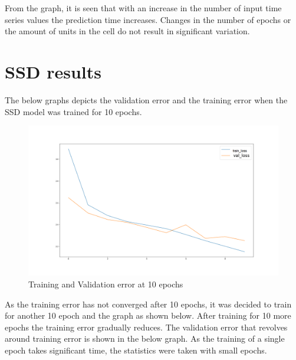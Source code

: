 From the graph, it is seen that with an increase in the number of input time series values the prediction time increases. Changes in the number of epochs or the amount of units in the cell do not result in significant variation.

\section{SSD results}
The below graphs depicts the validation error and the training error when the SSD model was trained for 10 epochs.
\begin{figure}[H]
\includegraphics[scale=0.4]{conf0_loss-val_loss_0_10epochs}
\begin{center}
\caption{Training and Validation error at 10 epochs}
\end{center}
\end{figure}

As the training error has not converged after 10 epochs, it was decided to train for another 10 epoch and the graph as shown below. After training for 10 more epochs the training error gradually reduces. The validation error that revolves around training error is shown in the below graph. As the training of a single epoch takes significant time, the statistics were taken with small epochs.

